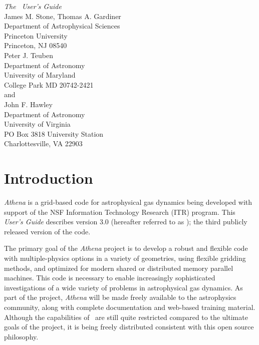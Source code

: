 \begin{center}
{\huge {\it The \ath\ User's Guide }} \vspace{1in} \\
{\Large James M. Stone, Thomas A. Gardiner} \\
{\large Department of Astrophysical Sciences \\ Princeton University \\
Princeton, NJ 08540} \vspace{0.5in} \\
{\Large Peter J. Teuben} \\
{\large Department of Astronomy \\ University of
Maryland \\ College Park MD 20742-2421} \vspace{0.5in} \\
and \vspace{0.5in} \\
{\Large John F. Hawley} \\
{\large Department of Astronomy \\ University of
Virginia \\ PO Box 3818 University Station \\ Charlottesville, VA 22903} \vspace{1in} \\
\end{center}
\newpage

\section{Introduction}

{\it Athena} is a grid-based code for astrophysical gas dynamics being
developed with support of the NSF Information Technology Research (ITR)
program.  This {\it User's Guide} describes version 3.0 (hereafter
referred to as \ath); the third publicly released version of the code.

The primary goal of the {\it Athena} project is to develop a robust and
flexible code with multiple-physics options in a variety of geometries,
using flexible gridding methods, and optimized for modern shared or
distributed memory parallel machines.  This code is necessary to enable
increasingly sophisticated investigations of a wide variety of problems
in astrophysical gas dynamics.  As part of the project, {\it Athena}
will be made freely available to the astrophysics community, along with
complete documentation and web-based training material.  Although the
capabilities of \ath\ are still quite restricted compared to the ultimate
goals of the project, it is being freely distributed consistent with
this open source philosophy.

